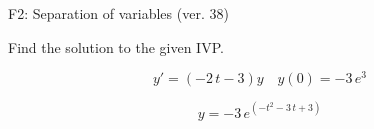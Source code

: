 \begin{exercise}
  \begin{exerciseTitle}F2: Separation of variables (ver. 38)\end{exerciseTitle}
  \begin{exerciseStatement}
    
Find the solution to the given IVP.

    
\[y'=( -2 \, t - 3 )y\hspace{1em} y(0)= -3 \, e^{3}\]

  \end{exerciseStatement}
  \begin{exerciseAnswer}
    
\[y= -3 \, e^{\left(-t^{2} - 3 \, t + 3\right)}\]

  \end{exerciseAnswer}
\end{exercise}